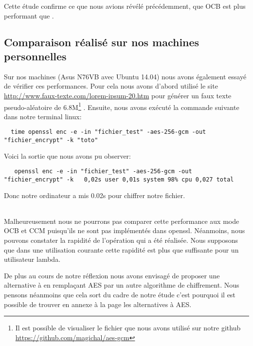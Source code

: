 Cette étude confirme ce que nous avions révélé précédemment, \cad que OCB est plus performant que \aes.%


\subsection{Comparaison réalisé sur nos machines personnelles}



Sur nos machines (Asus N76VB avec Ubuntu 14.04) nous avons également essayé de vérifier ces performances. Pour cela nous avons d'abord utilisé le site \url{http://www.faux-texte.com/lorem-ipsum-20.htm} pour générer un faux texte pseudo-aléatoire de 6.8M\footnote{Il est possible de visualiser le fichier que nous avons utilisé sur notre github \url{https://github.com/magichal/aes-gcm}} . Ensuite, nous avons exécuté la commande suivante dans notre terminal linux:

\begin{lstlisting}
  time openssl enc -e -in "fichier_test" -aes-256-gcm -out "fichier_encrypt" -k "toto"
\end{lstlisting}

  Voici la sortie que nous avons pu observer:

  \begin{lstlisting}
   openssl enc -e -in "fichier_test" -aes-256-gcm -out "fichier_encrypt" -k   0,02s user 0,01s system 98% cpu 0,027 total
  \end{lstlisting}

Donc notre ordinateur a mis 0.02s pour chiffrer notre fichier.

~\\

Malheureusement nous ne pourrons pas comparer cette performance aux mode OCB et CCM puisqu'ils ne sont pas implémentés dans openssl. Néanmoins, nous pouvons constater la rapidité de l'opération qui a été réalisée. Nous supposons que dans une utilisation courante cette rapidité est plus que suffisante pour un utilisateur lambda.

De plus au cours de notre réflexion nous avons envisagé de proposer une alternative à \aes en remplaçant AES par un autre algorithme de chiffrement. Nous pensons néanmoins que cela sort du cadre de notre étude c'est pourquoi il est possible de trouver en annexe à la page \pageref{anexe1} les alternatives à AES.




